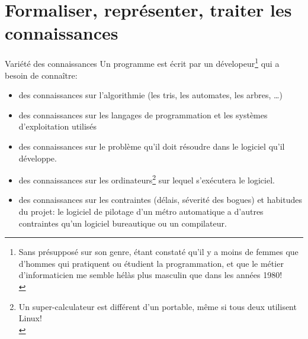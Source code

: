 \documentclass[final,a4,xcolor={svgnames,dvipsnames}]{beamer}
\begin{document}
 \section{Formaliser, représenter, traiter les connaissances}
 \label{sec:form-conn}
 
 \begin{frame}{Variété des connaissances}
   Un programme est écrit par un dévelopeur\footnote{Sans présupposé
   sur son genre, étant constaté qu'il y a moins de femmes que
   d'hommes qui pratiquent ou étudient la programmation, et que le
   métier d'informaticien me semble hélàs plus masculin que dans les années
   1980!\\} qui a besoin de connaître:
   \begin{relsize}{-0.5}
   \begin{itemize}
   \item des connaissances sur l'algorithmie (les tris, les automates, les arbres, \ldots)
   \item des connaissances sur les langages de programmation et les systèmes d'exploitation utilisés
   \item des connaissances sur le problème qu'il doit résoudre dans le logiciel qu'il développe.
   \item des connaissances sur les ordinateurs\footnote{Un
   super-calculateur est différent d'un portable, même si tous deux
   utilisent Linux!\medskip\\} sur lequel s'exécutera le logiciel.
   \item des connaissances sur les contraintes (délais, séverité des
     bogues) et habitudes du projet: le logiciel de pilotage d'un
     métro automatique a d'autres contraintes qu'un logiciel
     bureautique ou un compilateur.
   \end{itemize}
   \end{relsize}
 \end{frame}
\end{document}
